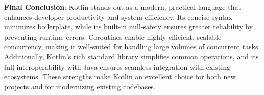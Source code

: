 \vspace{1em}

\noindent \textbf{Final Conclusion}: Kotlin stands out as a modern, practical language that enhances developer productivity and system efficiency. Its concise syntax minimizes boilerplate, while its built-in null-safety ensures greater reliability by preventing runtime errors. Coroutines enable highly efficient, scalable concurrency, making it well-suited for handling large volumes of concurrent tasks. Additionally, Kotlin’s rich standard library simplifies common operations, and its full interoperability with Java ensures seamless integration with existing ecosystems. These strengths make Kotlin an excellent choice for both new projects and for modernizing existing codebases.




